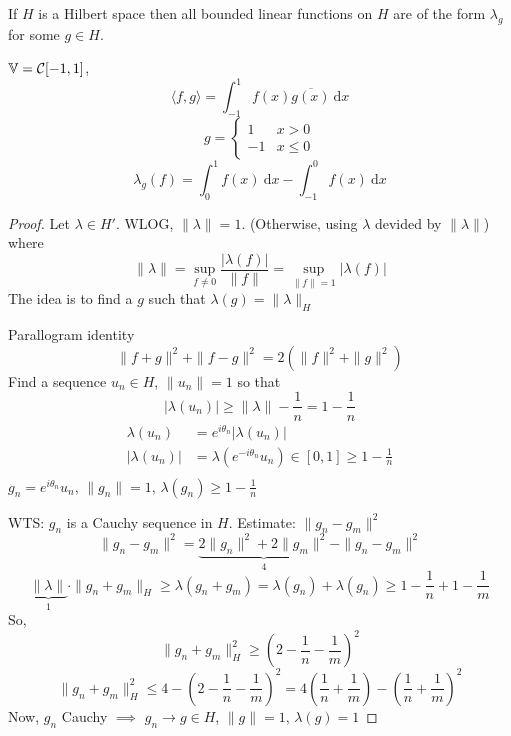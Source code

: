 \begin{theorem}
  If $H$ is a Hilbert space then all bounded linear functions on $H$ are of the form $\lambda_g$ 
  for some $g \in H$.
\end{theorem}

\begin{example}
  $\mathbb{V} = \mathcal C[-1, 1]$, 
  \[\langle f, g\rangle = \int_{-1}^1 f(x)\overline{g(x)} \ \mathrm{d}x\]
  $$g = \begin{cases}
    1 & x > 0 \\
    -1 & x \leq 0 
  \end{cases}$$
  \[\lambda_g(f) = \int_0^1 f(x) \ \mathrm{d}x - \int_{-1}^0 f(x) \ \mathrm{d}x\]
\end{example}

\begin{proof}
  Let $\lambda \in H'$. WLOG, $\|\lambda\| = 1$. (Otherwise, using $\lambda$ devided by $\|\lambda\|$)
  where
  \[\|\lambda\| = \sup_{f \neq 0} \frac{|\lambda(f)|}{\|f\|} = \sup_{\|f\|=1} |\lambda(f)|\]
  The idea is to find a $g$ such that $\lambda(g) = \|\lambda\|_{H}$
  
  Parallogram identity
  \[\|f+g\|^2 + \|f-g\|^2 = 2(\|f\|^2 + \|g\|^2)\]
  Find a sequence $u_n \in H$, $\|u_n\|=1$ so that
  \[|\lambda(u_n)| \ge \|\lambda\|-\frac1n = 1-\frac1n\]
  \begin{align*}
    \lambda(u_n) &= e^{i\theta_n}|\lambda(u_n)| \\
    |\lambda(u_n)| &= \lambda(e^{-i\theta_n}u_n) \in [0, 1] \ge 1-\frac1n \\ 
  \end{align*}
  $g_n = e^{i\theta_n}u_n$, $\|g_n\| = 1$, $\lambda(g_n) \ge 1-\frac1n$

  WTS: $g_n$ is a Cauchy sequence in $H$.
  Estimate: $\|g_n - g_m\|^2$
  \[\|g_n - g_m\|^2 = \underbrace{2\|g_n\|^2 + 2\|g_m\|^2}_{4} - \|g_n - g_m\|^2\]
  \[\underbrace{\|\lambda\|}_{1}\cdot\|g_n + g_m\|_H \ge \lambda(g_n + g_m) = \lambda(g_n) + \lambda(g_n) \ge 1-\frac1n + 1-\frac1m\]
  So, 
  \[\|g_n + g_m\|_H^2 \ge \left(2 - \frac1n - \frac1m\right)^2\]
  \[\|g_n + g_m\|_H^2 \le 4- \left(2 - \frac1n - \frac1m\right)^2 = 4\left(\frac1n + \frac1m\right) - \left(\frac1n+ \frac1m\right)^2\]
  Now, $g_n$ Cauchy $\implies$ $g_n\to g \in H$, $\|g\|=1$, $\lambda(g) = 1$


\end{proof}
